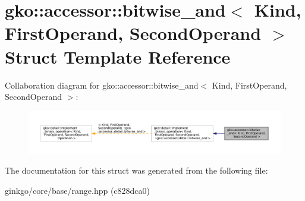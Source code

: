 \hypertarget{structgko_1_1accessor_1_1bitwise__and}{}\section{gko\+:\+:accessor\+:\+:bitwise\+\_\+and$<$ Kind, First\+Operand, Second\+Operand $>$ Struct Template Reference}
\label{structgko_1_1accessor_1_1bitwise__and}


Collaboration diagram for gko\+:\+:accessor\+:\+:bitwise\+\_\+and$<$ Kind, First\+Operand, Second\+Operand $>$\+:
\nopagebreak
\begin{figure}[H]
\begin{center}
\leavevmode
\includegraphics[width=350pt]{structgko_1_1accessor_1_1bitwise__and__coll__graph}
\end{center}
\end{figure}


The documentation for this struct was generated from the following file\+:\begin{DoxyCompactItemize}
\item 
ginkgo/core/base/range.\+hpp (c828dca0)\end{DoxyCompactItemize}
